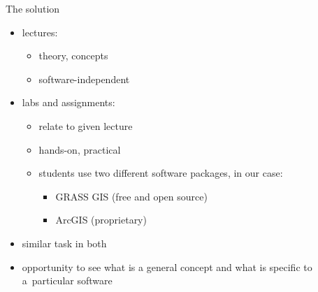 \documentclass[xcolor={dvipsnames,usenames},beamer,aspectratio=169]{beamer}
\begin{document}
\begin{frame}{The solution}

\begin{itemize}
 \item lectures:
 \begin{itemize}
  \item theory, concepts
  \item software-independent
 \end{itemize}
 \item labs and assignments:
 \begin{itemize}
  \item relate to given lecture
  \item hands-on, practical
  \item \alert<1>{students use two different software packages}\pause, in our case:
  \begin{itemize}
   \item GRASS GIS (free and open source)
   \item ArcGIS (proprietary)
  \end{itemize}
 \end{itemize}
  \pause
  \item similar task in both
  \item opportunity to see what is a general concept
        and what is specific to a~particular software
\end{itemize}

\end{frame}
\end{document}

